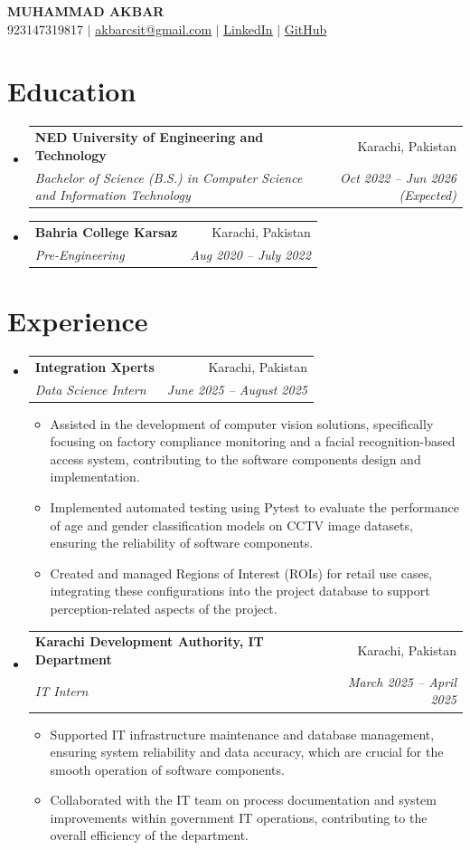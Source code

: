 \documentclass[letterpaper,11pt]{article}
\makeatletter
\newcommand{\resumeItem}[1]{
  \item\small{
    {#1 \vspace{-2pt}}
  }
}
\newcommand{\resumeSubheading}[4]{
  \vspace{-2pt}\item
    \begin{tabular*}{0.97\textwidth}[t]{l@{\extracolsep{\fill}}r}
      \textbf{#1} & #2 \\
      \textit{\small#3} & \textit{\small #4} \\
    \end{tabular*}\vspace{-7pt}
}
\newcommand{\resumeSubHeadingListStart}{\begin{itemize}[leftmargin=0.15in, label={}]}
\newcommand{\resumeSubHeadingListEnd}{\end{itemize}}
\newcommand{\resumeItemListStart}{\begin{itemize}}
\newcommand{\resumeItemListEnd}{\end{itemize}\vspace{-5pt}}
\makeatother
\begin{document}
\begin{center}
    \textbf{\Huge \scshape MUHAMMAD AKBAR} \\ \vspace{1pt}
    \small 923147319817 $|$ \href{mailto:akbarcsit@gmail.com}{\underline{akbarcsit@gmail.com}} $|$ 
    \href{https://www.linkedin.com/in/muhammad-akbar-0b7767270}{\underline{LinkedIn}} $|$
    \href{https://github.com/muakbar04}{\underline{GitHub}}
\end{center}


\section{Education}
  \resumeSubHeadingListStart
        \resumeSubheading
      {NED University of Engineering and Technology}{Karachi, Pakistan}
      {Bachelor of Science (B.S.) in Computer Science and Information Technology}{Oct 2022 – Jun 2026 (Expected)}
        \resumeSubheading
      {Bahria College Karsaz}{Karachi, Pakistan}
      {Pre-Engineering}{Aug 2020 – July 2022}
      \resumeSubHeadingListEnd


\section{Experience}
  \resumeSubHeadingListStart
        \resumeSubheading
      {Integration Xperts}{Karachi, Pakistan}
      {Data Science Intern}{June 2025 – August 2025}
      \resumeItemListStart
                \resumeItem{Assisted in the development of computer vision solutions, specifically focusing on factory compliance monitoring and a facial recognition-based access system, contributing to the software components design and implementation.}
                \resumeItem{Implemented automated testing using Pytest to evaluate the performance of age and gender classification models on CCTV image datasets, ensuring the reliability of software components.}
                \resumeItem{Created and managed Regions of Interest (ROIs) for retail use cases, integrating these configurations into the project database to support perception-related aspects of the project.}
              \resumeItemListEnd
        \resumeSubheading
      {Karachi Development Authority, IT Department}{Karachi, Pakistan}
      {IT Intern}{March 2025 – April 2025}
      \resumeItemListStart
                \resumeItem{Supported IT infrastructure maintenance and database management, ensuring system reliability and data accuracy, which are crucial for the smooth operation of software components.}
                \resumeItem{Collaborated with the IT team on process documentation and system improvements within government IT operations, contributing to the overall efficiency of the department.}
              \resumeItemListEnd
      \resumeSubHeadingListEnd
\end{document}
